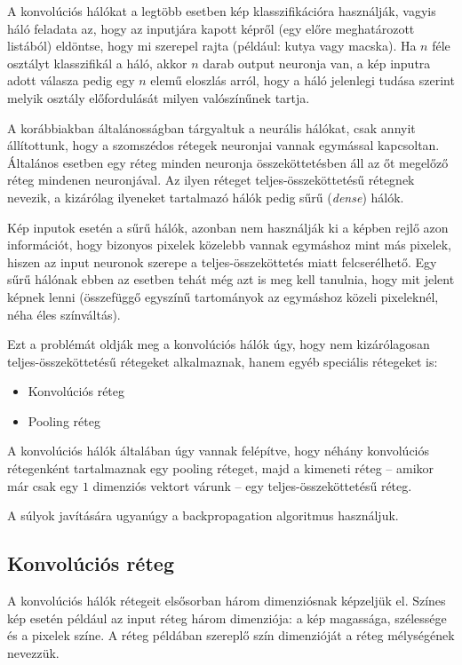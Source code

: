 A konvolúciós hálókat a legtöbb esetben kép klasszifikációra használják, vagyis háló feladata az, hogy az inputjára kapott képről (egy előre meghatározott listából) eldöntse, hogy  mi szerepel rajta (például: kutya vagy macska). Ha $n$ féle osztályt klasszifikál a háló, akkor $n$ darab output neuronja van, a kép inputra adott válasza pedig egy $n$ elemű eloszlás arról, hogy a háló jelenlegi tudása szerint melyik osztály előfordulását milyen valószínűnek tartja.

A korábbiakban általánosságban tárgyaltuk a neurális hálókat, csak annyit állítottunk, hogy a szomszédos rétegek neuronjai vannak egymással kapcsoltan. Általános esetben egy réteg minden neuronja összeköttetésben áll az őt megelőző réteg mindenen neuronjával. Az ilyen réteget teljes-összeköttetésű rétegnek nevezik, a kizárólag ilyeneket tartalmazó hálók pedig sűrű (\emph{dense}) hálók.

Kép inputok esetén a sűrű hálók, azonban nem használják ki a képben rejlő azon információt, hogy bizonyos pixelek közelebb vannak egymáshoz mint más pixelek, hiszen az input neuronok szerepe a teljes-összeköttetés miatt felcserélhető. Egy sűrű hálónak ebben az esetben tehát még azt is meg kell tanulnia, hogy mit jelent képnek lenni (összefüggő egyszínű tartományok az egymáshoz közeli pixeleknél, néha éles színváltás).

Ezt a problémát oldják meg a konvolúciós hálók úgy, hogy nem kizárólagosan teljes-összeköttetésű rétegeket alkalmaznak, hanem egyéb speciális rétegeket is:

\begin{itemize}
  \item Konvolúciós réteg
  \item Pooling réteg
\end{itemize}

A konvolúciós hálók általában úgy vannak felépítve, hogy néhány konvolúciós rétegenként tartalmaznak egy pooling réteget, majd a kimeneti réteg -- amikor már csak egy $1$ dimenziós vektort várunk -- egy teljes-összeköttetésű réteg.

A súlyok javítására ugyanúgy a backpropagation algoritmus használjuk.

\subsection{Konvolúciós réteg}

A konvolúciós hálók rétegeit elsősorban három dimenziósnak képzeljük el. Színes kép esetén például az input réteg három dimenziója: a kép magassága, szélessége és a pixelek színe. A réteg példában szereplő szín dimenzióját a réteg mélységének nevezzük.


